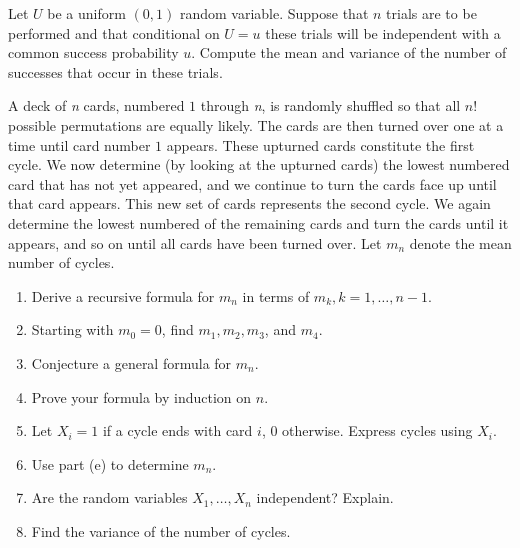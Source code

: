 \begin{exercise}
\label{ex:conditioning-expectation-38}
Let $U$ be a uniform $(0, 1)$ random variable. Suppose that $n$ trials are to be performed and that conditional on $U = u$ these trials will be independent with a common success probability $u$. Compute the mean and variance of the number of successes that occur in these trials.
\end{exercise}


\begin{exercise}
\label{ex:conditioning-expectation-39}
A deck of \textit{n} cards, numbered $1$ through \textit{n}, is randomly shuffled so that all $n!$ possible
permutations are equally likely. The cards are then turned over one at a time until card number $1$ appears. These upturned cards constitute the first cycle. We now determine (by looking at the upturned cards) the lowest numbered card that has not yet appeared, and we continue to turn the cards face up until that card appears.
This new set of cards represents the second cycle. We again determine the lowest numbered of the remaining cards and turn the cards until it appears, and so on until
all cards have been turned over. Let $m_n$ denote the mean number of cycles.
\begin{enumerate}
    \item[(a)] Derive a recursive formula for $m_n$ in terms of $m_k, k = 1, \ldots, n - 1$.
    \item[(b)] Starting with $m_0 = 0$, find $m_1, m_2, m_3$, and $m_4$.
    \item[(c)] Conjecture a general formula for $m_n$.
    \item[(d)] Prove your formula by induction on $n$.
    \item[(e)] Let $X_i = 1$ if a cycle ends with card $i$, 0 otherwise. Express cycles using $X_i$.
    \item[(f)] Use part (e) to determine $m_n$.
    \item[(g)] Are the random variables $X_1, \ldots, X_n$ independent? Explain.
    \item[(h)] Find the variance of the number of cycles.
\end{enumerate}
\end{exercise}

